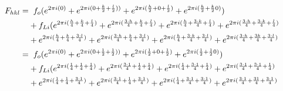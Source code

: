 \documentclass{article}
\begin{document}
	\begin{align*}
		F_{hkl} =& \hspace{0.2cm} f_{o}  (e^{2 \pi i (0)} 
		+ e^{2 \pi i (0 + \frac{k}{2} + \frac{l}{2}))} 
		+ e^{2 \pi i (\frac{h}{2} + 0 + \frac{l}{2})} 
		+ e^{2 \pi i (\frac{h}{2} + \frac{k}{2}0)})  \\
		 &+ f_{Li} (e^{2 \pi i (\frac{h}{4} + \frac{k}{4} + \frac{l}{4})}  
		 + e^{2 \pi i (\frac{3 \cdot h}{4} + \frac{k}{4} + \frac{l}{4})} 
		 + e^{2 \pi i (\frac{h}{4} + \frac{3 \cdot k}{4} + \frac{l}{4})} 
		 + e^{2 \pi i (\frac{3 \cdot h}{4} + \frac{3 \cdot k}{4} + \frac{l}{4})} \\
		 &+ e^{2 \pi i (\frac{h}{4} + \frac{k}{4} + \frac{3 \cdot l}{4})}
		  + e^{2 \pi i (\frac{3 \cdot h}{4} + \frac{k}{4} + \frac{3 \cdot l}{4})} 
		  + e^{2 \pi i (\frac{h}{4} + \frac{3 \cdot k}{4} + \frac{3 \cdot l}{4})} 
		  + e^{2 \pi i (\frac{3 \cdot h}{4} + \frac{3k}{4} + \frac{3 \cdot l}{4})} \\
		=& \hspace{0.2cm} f_{o}  (e^{2 \pi i (0)} 
		+ e^{2 \pi i (0 + \frac{1}{2} + \frac{1}{2}))} 
		+ e^{2 \pi i (\frac{1}{2} + 0 + \frac{1}{2})} 
		+ e^{2 \pi i (\frac{1}{2} + \frac{1}{2}0)})  \\
		&+ f_{Li} (e^{2 \pi i (\frac{1}{4} + \frac{1}{4} + \frac{1}{4})}  
		+ e^{2 \pi i (\frac{3 \cdot 1}{4} + \frac{1}{4} + \frac{1}{4})} 
		+ e^{2 \pi i (\frac{1}{4} + \frac{3 \cdot 1}{4} + \frac{1}{4})} 
		+ e^{2 \pi i (\frac{3 \cdot 1}{4} + \frac{3 \cdot 1}{4} + \frac{1}{4})} \\
		&+ e^{2 \pi i (\frac{1}{4} + \frac{1}{4} + \frac{3 \cdot 1}{4})}
		+ e^{2 \pi i (\frac{3 \cdot 1}{4} + \frac{1}{4} + \frac{3 \cdot 1}{4})} 
		+ e^{2 \pi i (\frac{1}{4} + \frac{3 \cdot 1}{4} + \frac{3 \cdot 1}{4})} 
		+ e^{2 \pi i (\frac{3 \cdot 1}{4} + \frac{31}{4} + \frac{3 \cdot 1}{4})} \\
	\end{align*}
\end{document}
